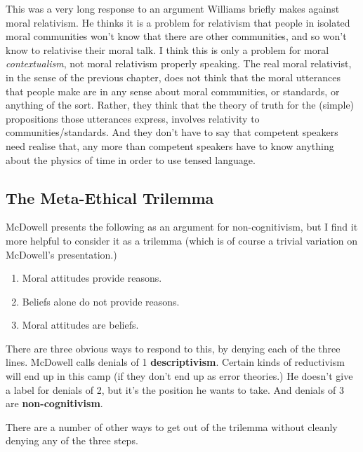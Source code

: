\documentclass[
]{article}
\providecommand{\tightlist}{%
  \setlength{\itemsep}{0pt}\setlength{\parskip}{0pt}}
\begin{document}
This was a very long response to an argument Williams briefly makes
against moral relativism. He thinks it is a problem for relativism that
people in isolated moral communities won't know that there are other
communities, and so won't know to relativise their moral talk. I think
this is only a problem for moral \emph{contextualism}, not moral
relativism properly speaking. The real moral relativist, in the sense of
the previous chapter, does not think that the moral utterances that
people make are in any sense about moral communities, or standards, or
anything of the sort. Rather, they think that the theory of truth for
the (simple) propositions those utterances express, involves relativity
to communities/standards. And they don't have to say that competent
speakers need realise that, any more than competent speakers have to
know anything about the physics of time in order to use tensed language.

\hypertarget{the-meta-ethical-trilemma}{%
\subsection{The Meta-Ethical Trilemma}\label{the-meta-ethical-trilemma}}

McDowell presents the following as an argument for non-cognitivism, but
I find it more helpful to consider it as a trilemma (which is of course
a trivial variation on McDowell's presentation.)

\begin{enumerate}
\def\labelenumi{\arabic{enumi}.}
\tightlist
\item
  Moral attitudes provide reasons.
\item
  Beliefs alone do not provide reasons.
\item
  Moral attitudes are beliefs.
\end{enumerate}

There are three obvious ways to respond to this, by denying each of the
three lines. McDowell calls denials of 1 \textbf{descriptivism}. Certain
kinds of reductivism will end up in this camp (if they don't end up as
error theories.) He doesn't give a label for denials of 2, but it's the
position he wants to take. And denials of 3 are
\textbf{non-cognitivism}.

There are a number of other ways to get out of the trilemma without
cleanly denying any of the three steps.
\end{document}
